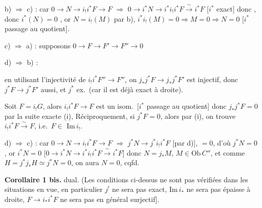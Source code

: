 \documentclass[11pt,a4paper]{article}
\begin{document}
b) $\Longrightarrow$ c) : car $0 \to N \to i_{!} i^{*} F \to F$
$\Longrightarrow$ $0 \to i^{*}N \to i^{*} i_{!} i^{*} F
\xrightarrow{\ \sim\ } i^{*}F$ [$i^{*}$ exact] donc \ill{}, donc
$i^{*}(N) = 0$ \struck{\ill{}}, or $N = i_{!}(M)$ par b),
$i^{*} i_{!}(M) = 0 \Rightarrow M = 0 \Rightarrow N = 0$ [$i^{*}$ passage au
quotient].

c) $\Longrightarrow$ a) : \struck{\ill{}} supposons
$0 \to F \to F' \to F'' \to 0$ \ill{}


d) $\Longrightarrow$ b) :


en utilisant l'injectivité de $i_{!} i^{*} F'' \to F''$, on 
$j_{*} j^{*} F \to j_{*} j^{*} F'$ est injectif, donc $j^{*}F \to j^{*}F'$
aussi, et $j^{*}$ ex.\ (car il est déjà exact à droite).

Soit $F = i_{!}G$, alors $i_{!} i^{*} F \longrightarrow F$ est un isom.\
[$i^{*}$ passage au quotient] donc $j_{*} j^{*} F = 0$ \struck{\ill{}} par la
suite exacte (i), \struck{donc $j^{*}F = 0$.} Réciproquement, si
$j^{*}F = 0$, alors par (i), on trouve
$i_{!} i^{*} F \xrightarrow{\ \sim\ } F$, i.e.\ $F \in$ \struck{\ill{}}
$\mathrm{Im}\, i_{!}$.


d) $\Longrightarrow$ c) : car \struck{\ill{}} $0 \to N \to i_{!} i^{*} F \to
F$ \ill{} $\Longrightarrow$ $j^{*}N \to j^{*} i_{!} i^{*} F$ \struck{\ill{}}
[par d)], $= 0$, d'où $j^{*}N = 0$, or \ill{} $i^{*}N = 0$
$\bigl[ 0 \to i^{*}N \to i^{*} i_{!} i^{*} F \xrightarrow{\ \sim\ } i^{*}F
\bigr]$ donc $N = j_{*}M$, $M \in \mathrm{Ob}\, C''$, et comme
$H = j^{*} j_{*} H \simeq j^{*}N = 0$, on aura $N = 0$, cqfd.


\textbf{Corollaire 1 bis.} dual. (Les conditions ci-dessus ne sont pas
vérifiées dans les situations en vue, en particulier $j^{!}$ ne sera pas
exact, $\mathrm{Im}\, i_{*}$ ne sera pas épaisse à droite,
$F \to i_{*} i^{*} F$ ne sera pas en général surjectif].
\end{document}
